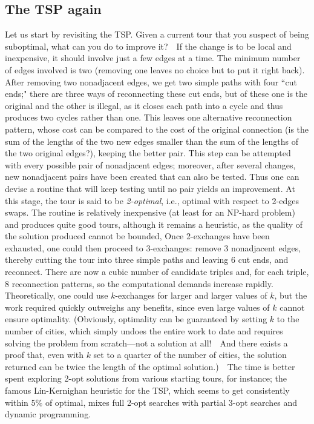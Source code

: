 \documentclass[11pt]{article}
\begin{document}
\subsection{The TSP again}
Let us start by revisiting the TSP. Given a current tour that you suspect of
being suboptimal, what can you do to improve it?\ \ If the change is to be
local and inexpensive, it should involve just a few edges at a time.  The
minimum number of edges involved is two (removing one leaves no choice but
to put it right back).   After removing two nonadjacent edges, we get two
simple paths with four ``cut ends;"  there are three ways of reconnecting
these cut ends, but of these one is the original and the other is illegal,
as it closes each path into a cycle and thus produces two cycles rather
than one.  This leaves one alternative reconnection pattern, whose cost
can be compared to the cost of the original connection (is the sum of the
lengths of the two new edges smaller than the sum of the lengths of the
two original edges?), keeping the better pair.  This step can be attempted
with every possible pair of nonadjacent edges; moreover, after several
changes, new nonadjacent pairs have been created that can also be tested.
Thus one can devise a routine that will keep testing until no pair yields
an improvement.  At this stage, the tour is said to be \emph{2-optimal},
i.e., optimal with respect to 2-edges swaps.   The routine is relatively
inexpensive (at least for an NP-hard problem) and produces quite good tours,
although it remains a heuristic, as the quality of the solution produced cannot
be bounded,   Once 2-exchanges have been exhausted, one could then proceed
to 3-exchanges: remove 3 nonadjacent edges, thereby cutting the tour into
three simple paths and leaving 6 cut ends, and reconnect.  There are now
a cubic number of candidate triples and, for each triple, 8 reconnection
patterns, so the computational demands increase rapidly.  Theoretically,
one could use $k$-exchanges for larger and larger values of $k$, but the work
required quickly outweighs any benefits, since even large values of $k$
cannot ensure optimality.  (Obviously, optimality can be guaranteed by
setting $k$ to the number of cities, which simply undoes the entire work
to date and requires solving the problem from scratch---not a solution
at all!\ \ And there exists a proof that, even with $k$ set to a quarter
of the number of cities, the solution returned can be twice the length
of the optimal solution.)\ \ The time is better spent exploring 2-opt
solutions from various starting tours, for instance; the famous Lin-Kernighan
heuristic for the TSP, which seems to get consistently within 5\% of optimal,
mixes full 2-opt searches with partial 3-opt searches and dynamic programming.
\end{document}
